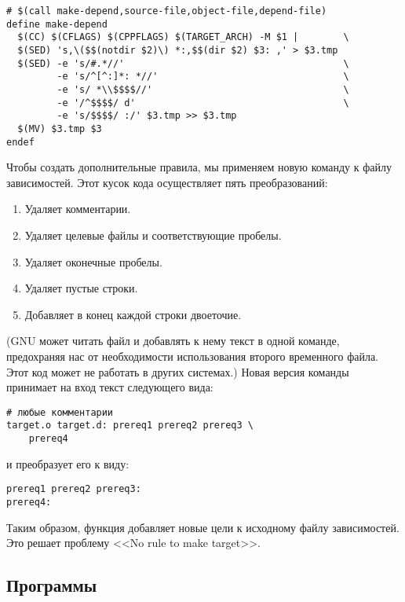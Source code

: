{\footnotesize
\begin{verbatim}
# $(call make-depend,source-file,object-file,depend-file)
define make-depend
  $(CC) $(CFLAGS) $(CPPFLAGS) $(TARGET_ARCH) -M $1 |        \
  $(SED) 's,\($$(notdir $2)\) *:,$$(dir $2) $3: ,' > $3.tmp
  $(SED) -e 's/#.*//'                                       \
         -e 's/^[^:]*: *//'                                 \
         -e 's/ *\\$$$$//'                                  \
         -e '/^$$$$/ d'                                     \
         -e 's/$$$$/ :/' $3.tmp >> $3.tmp
  $(MV) $3.tmp $3
endef
\end{verbatim}
}

Чтобы создать дополнительные правила, мы применяем новую команду
 к файлу зависимостей. Этот кусок кода 
осуществляет пять преобразований: \begin{enumerate} \item Удаляет
комментарии.  \item Удаляет целевые файлы и соответствующие пробелы.
\item Удаляет оконечные пробелы.  \item Удаляет пустые строки.  \item
Добавляет в конец каждой строки двоеточие.  \end{enumerate} (GNU
\utility{sed} может читать файл и добавлять к нему текст в одной
команде, предохраняя нас от необходимости использования второго
временного файла. Этот код может не работать в других системах.)
Новая версия команды \utility{sed} принимает на вход текст следующего
вида:

{\footnotesize
\begin{verbatim}
# любые комментарии
target.o target.d: prereq1 prereq2 prereq3 \
    prereq4
\end{verbatim}
}

{\flushleft и преобразует его к виду:}

{\footnotesize
\begin{verbatim}
prereq1 prereq2 prereq3:
prereq4:
\end{verbatim}
}

Таким образом, функция  добавляет новые цели к
исходному файлу зависимостей. Это решает проблему <<No rule to make
target>>.

\subsection{Программы \utility{makedepend}}

